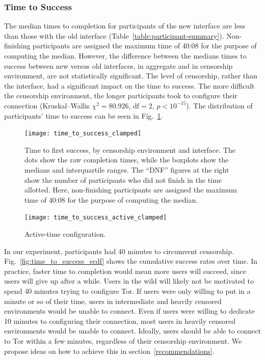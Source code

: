 \documentclass[USenglish,oneside,twocolumn]{article}
\begin{document}
\subsubsection{Time to Success} 
The median times to completion for participants of the new interface are less than those with the old interface (Table~\ref{table:participant-summary}). Non-finishing participants are assigned the maximum time of 40:08
for the purpose of computing the median. However, the difference between the medians times to success between new versus old interfaces, in aggregate and in censorship environment, are not statistically significant. The level of censorship, rather than the interface, had a significant impact on the time to success. The more difficult the censorship environment, the longer participants took to configure their connection (Kruskal--Wallis $\chi^2 = 80.926$, $\mbox{df} = 2$, $p < 10^{-15}$). The distribution of participants' time to success can be seen in Fig.~\ref{fig:time_to_success_clamped}.

\begin{figure}[t]
\centering
\texttt{[image: time\_to\_success\_clamped]}
\caption{
Time to first success, by censorship environment and interface.
The dots show the raw completion times,
while the boxplots show the medians and interquartile ranges.
The ``DNF'' figures at the right show the number of participants 
who did not finish in the time allotted.
Here, non-finishing participants are assigned the maximum time of 40:08
for the purpose of computing the median.
}
\label{fig:time_to_success_clamped}
\end{figure}

\begin{figure}[t]
\centering
\texttt{[image: time\_to\_success\_active\_clamped]}
\caption{
Active-time configuration.
}
\label{fig:time_to_success_active_clamped}
\end{figure}

In our experiment, participants had 40 minutes to circumvent censorship. Fig.~\ref{fig:time_to_success_ecdf} shows the cumulative success rates over time. In practice, faster time to completion would mean more users will succeed, since users will give up after a while. Users in the wild will likely not be motivated to spend 40 minutes trying to configure Tor. If users were only willing to put in a minute or so of their time, users in intermediate and heavily censored environments would be unable to connect. Even if users were willing to dedicate 10 minutes to configuring their connection, most users in heavily censored environments would be unable to connect. Ideally, users should be able to connect to Tor within a few minutes, regardless of their censorship environment. We propose ideas on how to achieve this in section~\ref{recommendations}. 
\end{document}
